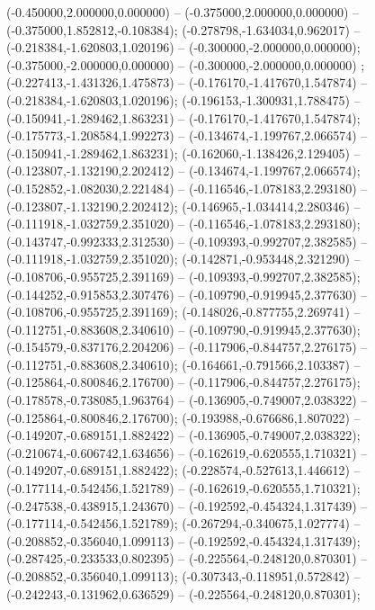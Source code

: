  (-0.450000,2.000000,0.000000) -- (-0.375000,2.000000,0.000000) -- (-0.375000,1.852812,-0.108384);
 (-0.278798,-1.634034,0.962017) -- (-0.218384,-1.620803,1.020196) -- (-0.300000,-2.000000,0.000000);
 (-0.375000,-2.000000,0.000000) -- (-0.300000,-2.000000,0.000000) ;
 (-0.227413,-1.431326,1.475873) -- (-0.176170,-1.417670,1.547874) -- (-0.218384,-1.620803,1.020196);
 (-0.196153,-1.300931,1.788475) -- (-0.150941,-1.289462,1.863231) -- (-0.176170,-1.417670,1.547874);
 (-0.175773,-1.208584,1.992273) -- (-0.134674,-1.199767,2.066574) -- (-0.150941,-1.289462,1.863231);
 (-0.162060,-1.138426,2.129405) -- (-0.123807,-1.132190,2.202412) -- (-0.134674,-1.199767,2.066574);
 (-0.152852,-1.082030,2.221484) -- (-0.116546,-1.078183,2.293180) -- (-0.123807,-1.132190,2.202412);
 (-0.146965,-1.034414,2.280346) -- (-0.111918,-1.032759,2.351020) -- (-0.116546,-1.078183,2.293180);
 (-0.143747,-0.992333,2.312530) -- (-0.109393,-0.992707,2.382585) -- (-0.111918,-1.032759,2.351020);
 (-0.142871,-0.953448,2.321290) -- (-0.108706,-0.955725,2.391169) -- (-0.109393,-0.992707,2.382585);
 (-0.144252,-0.915853,2.307476) -- (-0.109790,-0.919945,2.377630) -- (-0.108706,-0.955725,2.391169);
 (-0.148026,-0.877755,2.269741) -- (-0.112751,-0.883608,2.340610) -- (-0.109790,-0.919945,2.377630);
 (-0.154579,-0.837176,2.204206) -- (-0.117906,-0.844757,2.276175) -- (-0.112751,-0.883608,2.340610);
 (-0.164661,-0.791566,2.103387) -- (-0.125864,-0.800846,2.176700) -- (-0.117906,-0.844757,2.276175);
 (-0.178578,-0.738085,1.963764) -- (-0.136905,-0.749007,2.038322) -- (-0.125864,-0.800846,2.176700);
 (-0.193988,-0.676686,1.807022) -- (-0.149207,-0.689151,1.882422) -- (-0.136905,-0.749007,2.038322);
 (-0.210674,-0.606742,1.634656) -- (-0.162619,-0.620555,1.710321) -- (-0.149207,-0.689151,1.882422);
 (-0.228574,-0.527613,1.446612) -- (-0.177114,-0.542456,1.521789) -- (-0.162619,-0.620555,1.710321);
 (-0.247538,-0.438915,1.243670) -- (-0.192592,-0.454324,1.317439) -- (-0.177114,-0.542456,1.521789);
 (-0.267294,-0.340675,1.027774) -- (-0.208852,-0.356040,1.099113) -- (-0.192592,-0.454324,1.317439);
 (-0.287425,-0.233533,0.802395) -- (-0.225564,-0.248120,0.870301) -- (-0.208852,-0.356040,1.099113);
 (-0.307343,-0.118951,0.572842) -- (-0.242243,-0.131962,0.636529) -- (-0.225564,-0.248120,0.870301);
